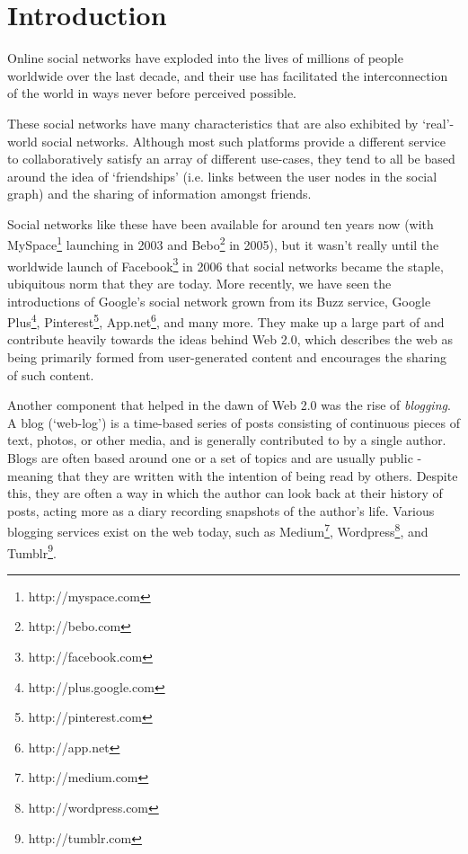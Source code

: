 \chapter{Introduction}

Online social networks have exploded into the lives of millions of people worldwide over the last decade, and their use has facilitated the interconnection of the world in ways never before perceived possible.

These social networks have many characteristics that are also exhibited by `real'-world social networks. Although most such platforms provide a different service to collaboratively satisfy an array of different use-cases, they tend to all be based around the idea of `friendships' (i.e. links between the user nodes in the social graph) and the sharing of information amongst friends.

Social networks like these have been available for around ten years now (with MySpace\footnote{http://myspace.com} launching in 2003 and Bebo\footnote{http://bebo.com} in 2005), but it wasn't really until the worldwide launch of Facebook\footnote{http://facebook.com} in 2006 that social networks became the staple, ubiquitous norm that they are today. More recently, we have seen the introductions of Google's social network grown from its Buzz service, Google Plus\footnote{http://plus.google.com}, Pinterest\footnote{http://pinterest.com}, App.net\footnote{http://app.net}, and many more. They make up a large part of and contribute heavily towards the ideas behind Web 2.0, which describes the web as being primarily formed from user-generated content and encourages the sharing of such content.

Another component that helped in the dawn of Web 2.0 was the rise of \textit{blogging}. A blog (`web-log') is a time-based series of posts consisting of continuous pieces of text, photos, or other media, and is generally contributed to by a single author. Blogs are often based around one or a set of topics and are usually public - meaning that they are written with the intention of being read by others. Despite this, they are often a way in which the author can look back at their history of posts, acting more as a diary recording snapshots of the author's life. Various blogging services exist on the web today, such as Medium\footnote{http://medium.com}, Wordpress\footnote{http://wordpress.com}, and Tumblr\footnote{http://tumblr.com}.


